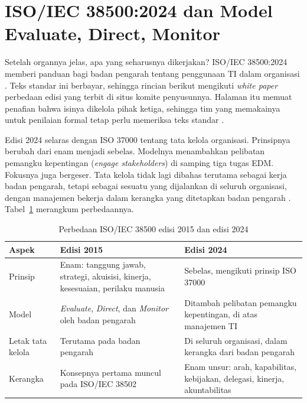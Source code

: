 \section{ISO/IEC 38500:2024 dan Model Evaluate, Direct, Monitor}

Setelah organnya jelas, apa yang seharusnya dikerjakan? ISO/IEC 38500:2024 memberi panduan
bagi badan pengarah tentang penggunaan TI dalam organisasi \cite{iso38500-2024}. Teks
standar ini berbayar, sehingga rincian berikut mengikuti \textit{white paper} perbedaan
edisi yang terbit di situs komite penyusunnya. Halaman itu memuat penafian bahwa isinya
dikelola pihak ketiga, sehingga tim yang memakainya untuk penilaian formal tetap perlu
memeriksa teks standar \cite{c02-iso-perubahan}.

Edisi 2024 selaras dengan ISO 37000 tentang tata kelola organisasi. Prinsipnya berubah dari
enam menjadi sebelas. Modelnya menambahkan pelibatan pemangku kepentingan
(\textit{engage stakeholders}) di samping tiga tugas EDM. Fokusnya juga bergeser. Tata
kelola tidak lagi dibahas terutama sebagai kerja badan pengarah, tetapi sebagai sesuatu yang
dijalankan di seluruh organisasi, dengan manajemen bekerja dalam kerangka yang ditetapkan
badan pengarah \cite{c02-iso-perubahan}. Tabel~\ref{tab:ch02-edisi} merangkum perbedaannya.

\begin{table}[!htb]
  \centering\small
  \caption{Perbedaan ISO/IEC 38500 edisi 2015 dan edisi 2024}\label{tab:ch02-edisi}
  \begin{tabularx}{\textwidth}{|>{\raggedright\arraybackslash}p{}|>{\raggedright\arraybackslash}X|>{\raggedright\arraybackslash}X|}
    \hline
    \textbf{Aspek} & \textbf{Edisi 2015} & \textbf{Edisi 2024} \\ \hline
    Prinsip & Enam: tanggung jawab, strategi, akuisisi, kinerja, kesesuaian, perilaku
    manusia & Sebelas, mengikuti prinsip ISO 37000 \\ \hline
    Model & \textit{Evaluate}, \textit{Direct}, dan \textit{Monitor} oleh badan pengarah &
    Ditambah pelibatan pemangku kepentingan, di atas manajemen TI \\ \hline
    Letak tata kelola & Terutama pada badan pengarah & Di seluruh organisasi, dalam kerangka
    dari badan pengarah \\ \hline
    Kerangka & Konsepnya pertama muncul pada ISO/IEC 38502 & Enam unsur: arah, kapabilitas,
    kebijakan, delegasi, kinerja, akuntabilitas \\ \hline
  \end{tabularx}
\end{table}

